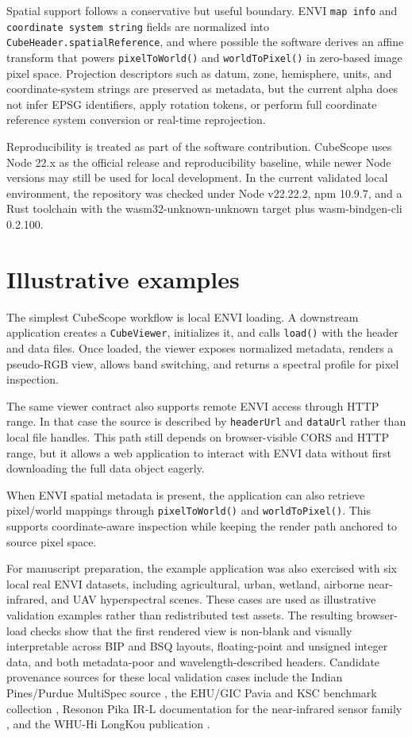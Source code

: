 \documentclass[preprint,12pt,a4paper]{elsarticle}
\begin{document}
Spatial support follows a conservative but useful boundary. ENVI
\texttt{map info} and \texttt{coordinate system string} fields are normalized
into \texttt{CubeHeader.spatialReference}, and where possible the software
derives an affine transform that powers \texttt{pixelToWorld()} and
\texttt{worldToPixel()} in zero-based image pixel space. Projection descriptors
such as datum, zone, hemisphere, units, and coordinate-system strings are
preserved as metadata, but the current alpha does not infer EPSG identifiers,
apply rotation tokens, or perform full coordinate reference system conversion
or real-time reprojection.

Reproducibility is treated as part of the software contribution. CubeScope uses
Node 22.x as the official release and reproducibility baseline, while newer
Node versions may still be used for local development. In the current validated
local environment, the repository was checked under Node v22.22.2, npm 10.9.7,
and a Rust toolchain with the wasm32-unknown-unknown target plus
wasm-bindgen-cli 0.2.100.

\section{Illustrative examples}

The simplest CubeScope workflow is local ENVI loading. A downstream application
creates a \texttt{CubeViewer}, initializes it, and calls \texttt{load()} with
the header and data files. Once loaded, the viewer exposes normalized metadata,
renders a pseudo-RGB view, allows band switching, and returns a spectral
profile for pixel inspection.

The same viewer contract also supports remote ENVI access through HTTP range.
In that case the source is described by \texttt{headerUrl} and \texttt{dataUrl}
rather than local file handles. This path still depends on browser-visible CORS
and HTTP range, but it allows a web application to interact with ENVI data
without first downloading the full data object eagerly.

When ENVI spatial metadata is present, the application can also retrieve
pixel/world mappings through \texttt{pixelToWorld()} and
\texttt{worldToPixel()}. This supports coordinate-aware inspection while
keeping the render path anchored to source pixel space.

For manuscript preparation, the example application was also exercised with six
local real ENVI datasets, including agricultural, urban, wetland, airborne
near-infrared, and UAV hyperspectral scenes. These cases are used as
illustrative validation examples rather than redistributed test assets. The
resulting browser-load checks show that the first rendered view is non-blank
and visually interpretable across BIP and BSQ layouts, floating-point and
unsigned integer data, and both metadata-poor and wavelength-described headers.
Candidate provenance sources for these local validation cases include the
Indian Pines/Purdue MultiSpec source \cite{purdueindian}, the EHU/GIC Pavia and
KSC benchmark collection \cite{ehugic}, Resonon Pika IR-L documentation for the
near-infrared sensor family \cite{resononpika}, and the WHU-Hi LongKou
publication \cite{zhong2020}.
\end{document}
